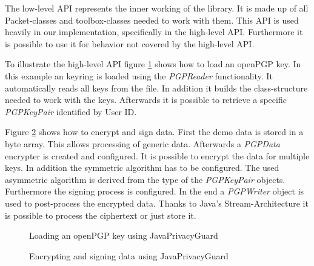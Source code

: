 The low-level API represents the inner working of the library. It is made up of all Packet-classes and toolbox-classes needed to work with them. This API is used heavily in our implementation, specifically in the high-level API. Furthermore it is possible to use it for behavior not covered by the high-level API.


To illustrate the high-level API figure \ref{fig:jpg:key} shows how to load an openPGP key. In this example an keyring is loaded using the \textit{PGPReader} functionality. It automatically reads all keys from the file. In addition it builds the class-structure needed to work with the keys. Afterwards it is possible to retrieve a specific \textit{PGPKeyPair} identified by User ID.

Figure \ref{fig:jpg:enc} shows how to encrypt and sign data. First the demo data is stored in a byte array. This allows processing of generic data. Afterwards a \textit{PGPData} encrypter is created and configured. It is possible to encrypt the data for multiple keys. In addition the symmetric algorithm has to be configured. The used asymmetric algorithm is derived from the type of the \textit{PGPKeyPair} objects. Furthermore the signing process is configured.  In the end a \textit{PGPWriter} object is used to post-process the encrypted data. Thanks to Java's Stream-Architecture it is possible to process the ciphertext or just store it.

\begin{figure}[p]
	\centering
	
	\caption{Loading an openPGP key using JavaPrivacyGuard}
	\label{fig:jpg:key}
\end{figure}

\begin{figure}[p]
	\centering
	
	\caption{Encrypting and signing data using JavaPrivacyGuard}
	\label{fig:jpg:enc}
\end{figure}

